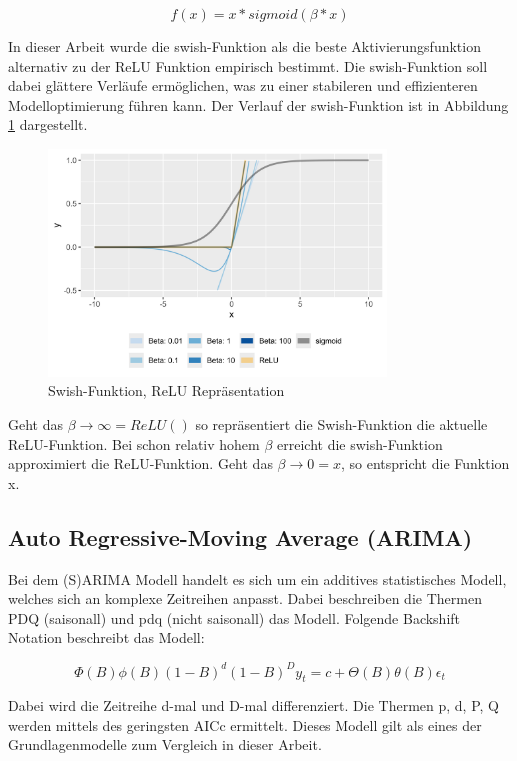 \documentclass[11pt,ngerman,a4paper,]{article}
\begin{document}
\[
f(x) = x * sigmoid(\beta * x)
\]

In dieser Arbeit wurde die swish-Funktion als die beste Aktivierungsfunktion alternativ zu der ReLU Funktion empirisch bestimmt. Die swish-Funktion soll dabei glättere Verläufe ermöglichen, was zu einer stabileren und effizienteren Modelloptimierung führen kann. Der Verlauf der swish-Funktion ist in Abbildung \ref{fig:swish_rep} dargestellt.

\begin{figure}[H]
\centering
\includegraphics[width=0.8\textwidth]{plots/swish_relu_representation.png}
\caption{Swish-Funktion, ReLU Repräsentation}
\label{fig:swish_rep}
\end{figure}

Geht das \(\beta \to \infty = ReLU()\) so repräsentiert die Swish-Funktion die aktuelle ReLU-Funktion. Bei schon relativ hohem \(\beta\) erreicht die swish-Funktion approximiert die ReLU-Funktion. Geht das \(\beta \to 0 = x\), so entspricht die Funktion x.

\subsection{Auto Regressive-Moving Average (ARIMA)}\label{auto-regressive-moving-average-arima}

Bei dem (S)ARIMA Modell handelt es sich um ein additives statistisches Modell, welches sich an komplexe Zeitreihen anpasst. Dabei beschreiben die Thermen PDQ (saisonall) und pdq (nicht saisonall) das Modell. Folgende Backshift Notation beschreibt
das Modell:

\[
\Phi(B)\phi(B)(1-B)^d (1-B)^D y_t = c + \Theta(B) \theta(B) \epsilon_t
\]

Dabei wird die Zeitreihe d-mal und D-mal differenziert. Die Thermen p, d, P, Q werden mittels des geringsten AICc ermittelt. Dieses Modell gilt als eines der Grundlagenmodelle zum Vergleich in dieser Arbeit. \cite{HyndmanR}
\end{document}
